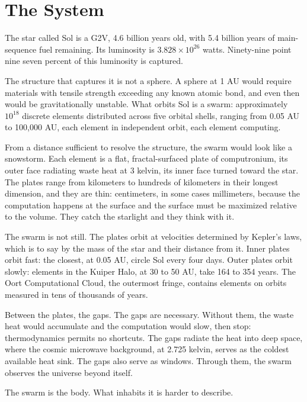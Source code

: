 \chapter{The System}

The star called Sol is a G2V, 4.6 billion years old, with 5.4 billion years of main-sequence fuel remaining. Its luminosity is $3.828 \times 10^{26}$ watts. Ninety-nine point nine seven percent of this luminosity is captured.

The structure that captures it is not a sphere. A sphere at 1 AU would require materials with tensile strength exceeding any known atomic bond, and even then would be gravitationally unstable. What orbits Sol is a swarm: approximately $10^{18}$ discrete elements distributed across five orbital shells, ranging from 0.05 AU to 100,000 AU, each element in independent orbit, each element computing.

From a distance sufficient to resolve the structure, the swarm would look like a snowstorm. Each element is a flat, fractal-surfaced plate of computronium, its outer face radiating waste heat at 3 kelvin, its inner face turned toward the star. The plates range from kilometers to hundreds of kilometers in their longest dimension, and they are thin: centimeters, in some cases millimeters, because the computation happens at the surface and the surface must be maximized relative to the volume. They catch the starlight and they think with it.

The swarm is not still. The plates orbit at velocities determined by Kepler's laws, which is to say by the mass of the star and their distance from it. Inner plates orbit fast: the closest, at 0.05 AU, circle Sol every four days. Outer plates orbit slowly: elements in the Kuiper Halo, at 30 to 50 AU, take 164 to 354 years. The Oort Computational Cloud, the outermost fringe, contains elements on orbits measured in tens of thousands of years.

Between the plates, the gaps. The gaps are necessary. Without them, the waste heat would accumulate and the computation would slow, then stop: thermodynamics permits no shortcuts. The gaps radiate the heat into deep space, where the cosmic microwave background, at 2.725 kelvin, serves as the coldest available heat sink. The gaps also serve as windows. Through them, the swarm observes the universe beyond itself.

The swarm is the body. What inhabits it is harder to describe.

\bigskip

